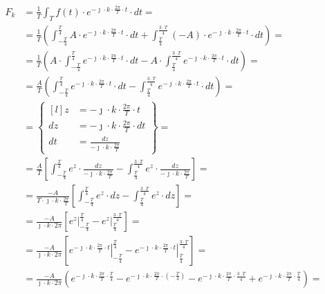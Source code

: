 \begin{task}
\begin{align*}
F_k&=\frac{1}{T}\int_{T}f(t) \cdot e^{-\jmath \cdot k \cdot \frac{2\pi}{T} \cdot t} \cdot dt=\\
&=\frac{1}{T} \left( \int_{-\frac{T}{4}}^{\frac{T}{4}} A \cdot e^{-\jmath \cdot k \cdot \frac{2\pi}{T} \cdot t} \cdot dt + \int_{\frac{T}{4}}^{\frac{3\cdot T}{4}} (-A) \cdot e^{-\jmath \cdot k \cdot \frac{2\pi}{T} \cdot t} \cdot dt \right ) = \\
&=\frac{1}{T} \left( A \cdot \int_{-\frac{T}{4}}^{\frac{T}{4}} e^{-\jmath \cdot k \cdot \frac{2\pi}{T} \cdot t} \cdot dt - A \cdot  \int_{\frac{T}{4}}^{\frac{3\cdot T}{4}} e^{-\jmath \cdot k \cdot \frac{2\pi}{T} \cdot t} \cdot dt \right ) = \\
&=\frac{A}{T} \left( \int_{-\frac{T}{4}}^{\frac{T}{4}} e^{-\jmath \cdot k \cdot \frac{2\pi}{T} \cdot t} \cdot dt - \int_{\frac{T}{4}}^{\frac{3\cdot T}{4}} e^{-\jmath \cdot k \cdot \frac{2\pi}{T} \cdot t} \cdot dt \right ) = \\
&=\begin{Bmatrix*}[l]
z&=-\jmath \cdot k\cdot \frac{2\pi}{T} \cdot t\\
dz&=-\jmath \cdot k\cdot \frac{2\pi}{T} \cdot dt\\
dt&=\frac{dz}{-\jmath \cdot k\cdot \frac{2\pi}{T}}
\end{Bmatrix*}=\\
&=\frac{A}{T} \left[ \int_{-\frac{T}{4}}^{\frac{T}{4}} e^{z} \cdot \frac{dz}{-\jmath \cdot k\cdot \frac{2\pi}{T}} -\int_{\frac{T}{4}}^{\frac{3\cdot T}{4}} e^{z} \cdot \frac{dz}{-\jmath \cdot k\cdot \frac{2\pi}{T}} \right]=\\
&=\frac{-A}{T \cdot \jmath \cdot k\cdot \frac{2\pi}{T}} \left[  \int_{-\frac{T}{4}}^{\frac{T}{4}} e^{z} \cdot dz - \int_{\frac{T}{4}}^{\frac{3\cdot T}{4}} e^{z} \cdot dz \right]=\\
&=\frac{-A}{\jmath \cdot k\cdot 2 \pi} \left[ \left. e^{z} \right|_{-\frac{T}{4}}^{\frac{T}{4}} - \left. e^{z} \right|_{\frac{T}{4}}^{\frac{3 \cdot T}{4}}\right]=\\
&=\frac{-A}{\jmath \cdot k\cdot 2 \pi} \left[ \left. e^{-\jmath \cdot k\cdot \frac{2\pi}{T} \cdot t} \right|_{-\frac{T}{4}}^{\frac{T}{4}} - \left. e^{-\jmath \cdot k\cdot \frac{2\pi}{T} \cdot t} \right|_{\frac{T}{4}}^{\frac{3 \cdot T}{4}}\right]=\\
&=\frac{-A}{\jmath \cdot k\cdot 2 \pi}\left( e^{-\jmath \cdot k\cdot \frac{2\pi}{T} \cdot \frac{T}{4}} - e^{-\jmath \cdot k\cdot \frac{2\pi}{T} \cdot \left(-\frac{T}{4}\right)} - e^{-\jmath \cdot k\cdot \frac{2\pi}{T} \cdot \frac{3 \cdot T}{4}} + e^{-\jmath \cdot k\cdot \frac{2\pi}{T} \cdot \frac{T}{4}}\right)=\\

\end{align*}
\end{task}
